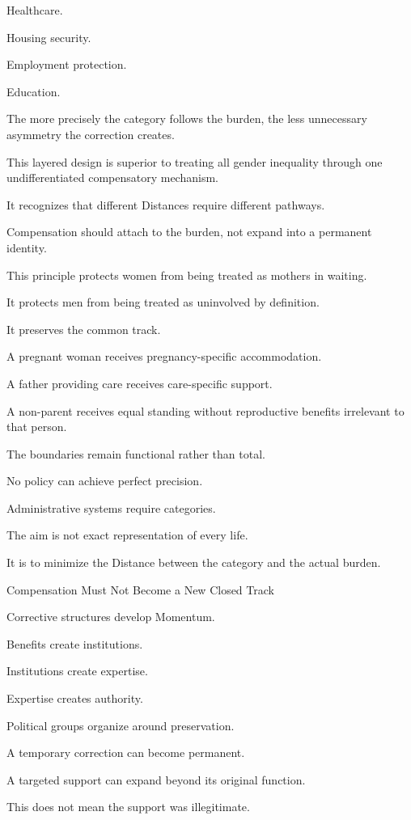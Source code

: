 Healthcare.

Housing security.

Employment protection.

Education.

The more precisely the category follows the burden, the less unnecessary asymmetry the correction creates.

This layered design is superior to treating all gender inequality through one undifferentiated compensatory mechanism.

It recognizes that different Distances require different pathways.

Compensation should attach to the burden, not expand into a permanent identity.

This principle protects women from being treated as mothers in waiting.

It protects men from being treated as uninvolved by definition.

It preserves the common track.

A pregnant woman receives pregnancy-specific accommodation.

A father providing care receives care-specific support.

A non-parent receives equal standing without reproductive benefits irrelevant to that person.

The boundaries remain functional rather than total.

No policy can achieve perfect precision.

Administrative systems require categories.

The aim is not exact representation of every life.

It is to minimize the Distance between the category and the actual burden.

Compensation Must Not Become a New Closed Track

Corrective structures develop Momentum.

Benefits create institutions.

Institutions create expertise.

Expertise creates authority.

Political groups organize around preservation.

A temporary correction can become permanent.

A targeted support can expand beyond its original function.

This does not mean the support was illegitimate.

